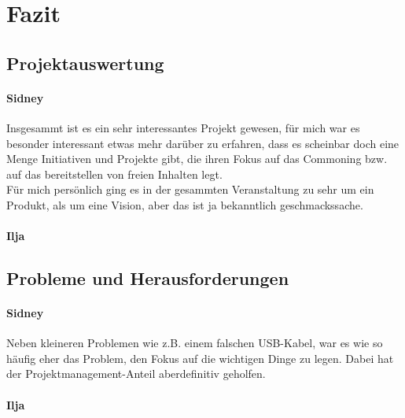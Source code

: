 
\chapter{Fazit} \label{Fazit}

\section{Projektauswertung} \label{Projektauswertung}

\subsubsection{Sidney}
Insgesammt ist es ein sehr interessantes Projekt gewesen, für mich war es besonder interessant etwas mehr darüber zu erfahren, dass es scheinbar doch eine Menge Initiativen und Projekte gibt, die ihren Fokus auf das Commoning bzw. auf das bereitstellen von freien Inhalten legt.\\
Für mich persönlich ging es in der gesammten Veranstaltung zu sehr um ein Produkt, als um eine Vision, aber das ist ja bekanntlich geschmackssache.\\

\subsubsection{Ilja}





\section{Probleme und Herausforderungen} \label{Probleme und Herausforderungen}

\subsubsection{Sidney}
Neben kleineren Problemen wie z.B. einem falschen USB-Kabel, war es wie so häufig eher das Problem, den Fokus auf die wichtigen Dinge zu legen. Dabei hat der Projektmanagement-Anteil  aberdefinitiv geholfen.

\subsubsection{Ilja}





